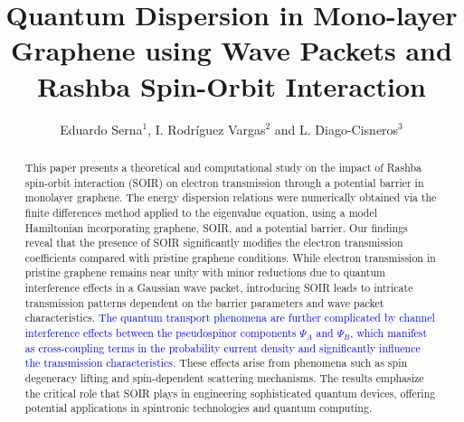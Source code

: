 \documentclass{../assets/templates/iopjournal}
\begin{document}

    \title{Quantum Dispersion in Mono-layer Graphene using Wave Packets and Rashba Spin-Orbit Interaction}
    
    \author{Eduardo Serna$^1$, I. Rodr\'iguez Vargas$^2$ and L. Diago-Cisneros$^3$}
    
       
    
    
    
    

    \begin{abstract}
        This paper presents a theoretical and computational study on the impact of Rashba spin-orbit interaction (SOIR) on electron transmission through a potential barrier in monolayer graphene.
        The energy dispersion relations were numerically obtained via the finite differences method applied to the eigenvalue equation, using a model Hamiltonian incorporating graphene, SOIR, and a potential barrier.
        Our findings reveal that the presence of SOIR significantly modifies the electron transmission coefficients compared with pristine graphene conditions.
        While electron transmission in pristine graphene remains near unity with minor reductions due to quantum interference effects in a Gaussian wave packet, introducing SOIR leads to intricate transmission patterns dependent on the barrier parameters and wave packet characteristics.
        \textcolor{blue}{The quantum transport phenomena are further complicated by channel interference effects between the pseudospinor components $\Psi_A$ and $\Psi_B$, which manifest as cross-coupling terms in the probability current density and significantly influence the transmission characteristics.}
        These effects arise from phenomena such as spin degeneracy lifting and spin-dependent scattering mechanisms.
        The results emphasize the critical role that SOIR plays in engineering sophisticated quantum devices, offering potential applications in spintronic technologies and quantum computing.
    \end{abstract}
\end{document}
